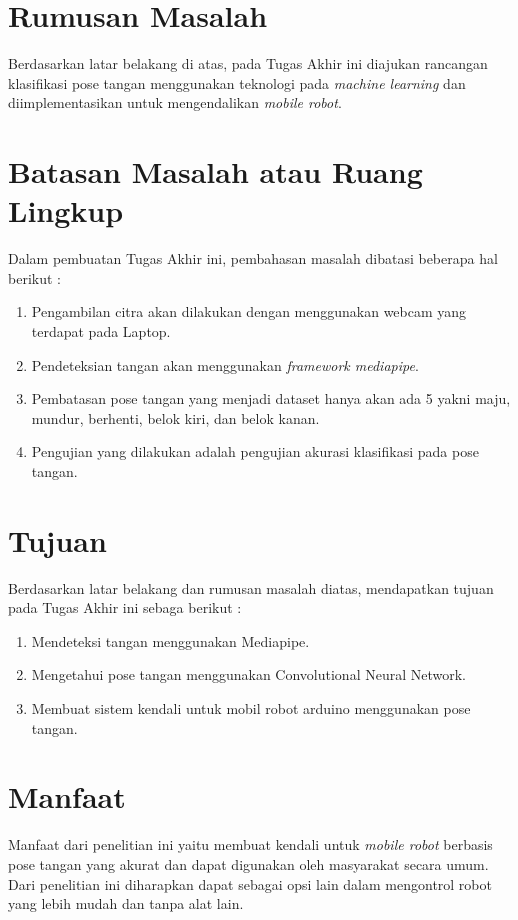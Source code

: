 \section{Rumusan Masalah}
Berdasarkan latar belakang di atas, pada Tugas Akhir ini diajukan rancangan klasifikasi pose tangan menggunakan teknologi pada \textit{machine learning} dan diimplementasikan untuk mengendalikan \textit{mobile robot}.

\section{Batasan Masalah atau Ruang Lingkup}

Dalam pembuatan Tugas Akhir ini, pembahasan masalah dibatasi beberapa hal berikut :
\begin{enumerate}
	\item Pengambilan citra akan dilakukan dengan menggunakan webcam yang terdapat pada Laptop.
	\item Pendeteksian tangan akan menggunakan \textit{framework mediapipe}.
	\item Pembatasan pose tangan yang menjadi dataset hanya akan ada 5 yakni maju, mundur, berhenti, belok kiri, dan belok kanan.
	\item Pengujian yang dilakukan adalah pengujian akurasi klasifikasi pada pose tangan.
\end{enumerate}

\section{Tujuan}

Berdasarkan latar belakang dan rumusan masalah diatas, mendapatkan tujuan pada Tugas Akhir ini sebaga berikut :
\begin{enumerate}
	\item Mendeteksi tangan menggunakan Mediapipe.
	\item Mengetahui pose tangan menggunakan Convolutional Neural Network.
	\item Membuat sistem kendali untuk mobil robot arduino menggunakan pose tangan.
\end{enumerate}

\section{Manfaat}
Manfaat dari penelitian ini yaitu membuat kendali untuk \textit{mobile robot} berbasis pose tangan yang akurat dan dapat digunakan oleh masyarakat secara umum. Dari penelitian ini diharapkan dapat sebagai opsi lain dalam mengontrol robot yang lebih mudah dan tanpa alat lain.
